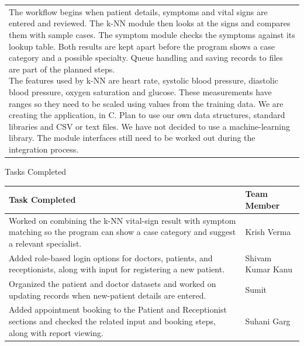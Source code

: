 \documentclass[12pt,a4paper]{article}
\newcommand{\sectiontitle}[1]{%
    {\color{GEUBlue}
    \fontsize{18}{22}\selectfont #1}
}
\newcommand{\answerbox}[2]{%
    \begin{tabularx}{\textwidth}{
        |>{\raggedright\arraybackslash}X|}
        \hline
        \parbox[t][#1][t]{\dimexpr\linewidth-12pt\relax}{
            \vspace{5pt}
            \fontsize{11}{13}\selectfont #2
        }\\
        \hline
    \end{tabularx}
}
\begin{document}
\answerbox{5.0cm}{The workflow begins when patient details, symptoms and vital signs are entered and reviewed. The k-NN module then looks at the signs and compares them with sample cases. The symptom module checks the symptoms against its lookup table. Both results are kept apart before the program shows a case category and a possible specialty. Queue handling and saving records to files are part of the planned steps.\\
The features used by k-NN are heart rate, systolic blood pressure, diastolic blood pressure, oxygen saturation and glucose. These measurements have ranges so they need to be scaled using values from the training data.
We are creating the application, in C. Plan to use our own data structures, standard libraries and CSV or text files. We have not decided to use a machine-learning library. The module interfaces still need to be worked out during the integration process.}

\newpage


\vspace*{0.20cm}

\sectiontitle{Tasks Completed }

\vspace{0.05cm}

\vspace{0.20cm}

\begin{tabularx}{\textwidth}{
|>{\raggedright\arraybackslash}X
|>{\raggedright\arraybackslash}X|}
\hline
\textbf{Task Completed} & \textbf{Team Member}\\
\hline
Worked on combining the k-NN vital-sign result with symptom matching so the program can show a case category and suggest a relevant specialist.
& Krish Verma\\
\hline
Added role-based login options for doctors, patients, and receptionists, along with input for registering a new patient.
& Shivam Kumar Kanu\\
\hline
Organized the patient and doctor datasets and worked on updating records when new-patient details are entered.
& Sumit\\
\hline
Added appointment booking to the Patient and Receptionist sections and checked the related input and booking steps, along with report viewing.
& Suhani Garg\\
\hline
\end{tabularx}
\end{document}
